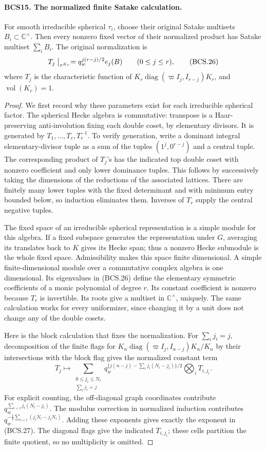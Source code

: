 \documentclass[11pt,a4paper]{article}
\numberwithin{equation}{section}
\theoremstyle{remark}\newtheorem{remark}[theorem]{Remark}
\begin{document}
\paragraph{BCS15. The normalized finite Satake calculation.}
\label{claim:BCS15}
For smooth irreducible spherical \(\tau_i\), choose their
original Satake multisets \(B_i\subset\mathbb C^\times\).
Then every nonzero fixed vector of their normalized product has
Satake multiset \(\sum_iB_i\).  The original normalization is
\[
 T_j\bigm|_{\tau^{K_r}}=
             q_w^{j(r-j)/2}e_j(B)\qquad(0\le j\le r),
 \tag{BCS.26}
\]
where \(T_j\) is the characteristic function of
\(K_r\operatorname{diag}(\varpi I_j,I_{r-j})K_r\), and
\(\operatorname{vol}(K_r)=1\).
\begin{proof}
We first record why these parameters exist for each irreducible
spherical factor.  The spherical Hecke algebra is commutative:
transpose is a Haar-preserving anti-involution fixing each double
coset, by elementary divisors.  It is generated by
\(T_1,\ldots,T_r,T_r^{-1}\).  To verify generation, write a
dominant integral elementary-divisor tuple as a sum of the tuples
\((1^j,0^{r-j})\) and a central tuple.  The corresponding product
of \(T_j\)'s has the indicated top double coset with nonzero
coefficient and only lower dominance tuples.  This follows by
successively taking the dimensions of the reductions of the
associated lattices.  There are finitely many lower tuples with
the fixed determinant and with minimum entry bounded below, so
induction eliminates them.  Inverses of \(T_r\) supply the central
negative tuples.

The fixed space of an irreducible spherical representation is a
simple module for this algebra.  If a fixed subspace generates the
representation under \(G\), averaging its translates back to
\(K\) gives its Hecke span; thus a nonzero Hecke submodule is the
whole fixed space.  Admissibility makes this space finite dimensional.
A simple finite-dimensional module over a commutative complex algebra
is one dimensional.  Its eigenvalues in (BCS.26) define the
elementary symmetric coefficients of a monic polynomial of degree
\(r\).  Its constant coefficient is nonzero because \(T_r\) is
invertible.  Its roots give a multiset in \(\mathbb C^\times\),
uniquely.  The same calculation works for every uniformizer, since
changing it by a unit does not change any of the double cosets.

Here is the block calculation that fixes the normalization.  For
\(\sum_i j_i=j\), decomposition of the finite flags for
\(K_n\operatorname{diag}(\varpi I_j,I_{n-j})K_n/K_n\) by their
intersections with the block flag gives the normalized constant term
\[
 T_j\longmapsto
 \sum_{\substack{0\le j_i\le N_i\\\sum_i j_i=j}}
 q_w^{\{j(n-j)-\sum_i j_i(N_i-j_i)\}/2}
                         \bigotimes_i T_{i,j_i}.
 \tag{BCS.27}
\]
For explicit counting, the off-diagonal graph coordinates contribute
\(q_w^{\sum_{i<l}j_i(N_l-j_l)}\).  The modulus correction in
normalized induction contributes
\(q_w^{-\frac12\sum_{i<l}(j_iN_l-j_lN_i)}\).
Adding these exponents gives exactly the exponent in (BCS.27).
The diagonal flags give the indicated \(T_{i,j_i}\); these cells
partition the finite quotient, so no multiplicity is omitted.


\end{proof}
\end{document}
